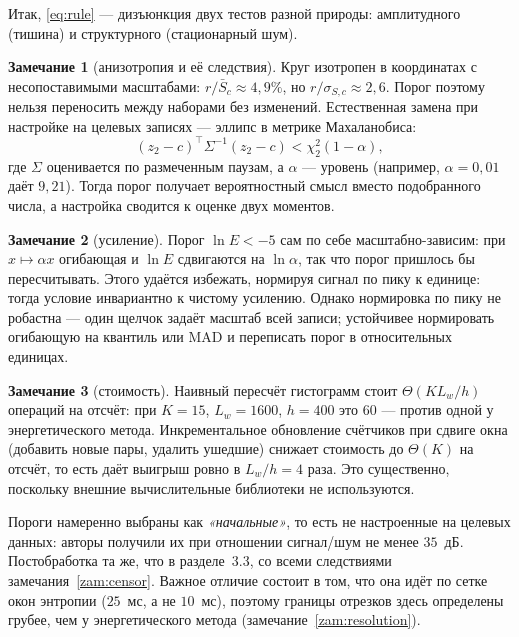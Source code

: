 \documentclass[11pt,a4paper]{article}
\theoremstyle{definition}
\newtheorem{zam}{Замечание}[section]
\theoremstyle{plain}
\begin{document}
Итак, \eqref{eq:rule} --- дизъюнкция двух тестов разной природы: амплитудного
(тишина) и структурного (стационарный шум).

\begin{zam}[анизотропия и её следствия]
Круг изотропен в координатах с несопоставимыми масштабами:
$r/\bar S_c\approx4{,}9\%$, но $r/\sigma_{S,c}\approx2{,}6$. Порог поэтому
нельзя переносить между наборами без изменений. Естественная замена при
настройке на целевых записях --- эллипс в метрике Махаланобиса:
\[
(z_2-c)^{\!\top}\Sigma^{-1}(z_2-c)<\chi^2_{2}(1-\alpha),
\]
где $\Sigma$ оценивается по размеченным паузам, а $\alpha$ --- уровень
(например, $\alpha=0{,}01$ даёт $9{,}21$). Тогда порог получает вероятностный
смысл вместо подобранного числа, а настройка сводится к оценке двух моментов.
\end{zam}

\begin{zam}[усиление]
Порог $\ln E<-5$ сам по себе масштабно-зависим: при $x\mapsto\alpha x$
огибающая и $\ln E$ сдвигаются на $\ln\alpha$, так что порог пришлось бы
пересчитывать. Этого удаётся избежать, нормируя сигнал по пику к единице:
тогда условие инвариантно к чистому усилению. Однако нормировка по пику
не робастна --- один щелчок задаёт масштаб всей записи; устойчивее нормировать
огибающую на квантиль или MAD и переписать порог в относительных единицах.
\end{zam}

\begin{zam}[стоимость]
Наивный пересчёт гистограмм стоит $\Theta(K L_w/h)$ операций на отсчёт: при
$K=15$, $L_w=1600$, $h=400$ это $60$ --- против одной у энергетического метода.
Инкрементальное обновление счётчиков при сдвиге окна (добавить новые пары,
удалить ушедшие) снижает стоимость до $\Theta(K)$ на отсчёт, то есть даёт
выигрыш ровно в $L_w/h=4$ раза. Это существенно, поскольку внешние
вычислительные библиотеки не используются.
\end{zam}

Пороги намеренно выбраны как \emph{«начальные»}, то есть не настроенные на
целевых данных: авторы получили их при отношении сигнал/шум не менее $35$~дБ.
Постобработка та же, что в разделе~3.3, со всеми следствиями
замечания~\ref{zam:censor}. Важное отличие состоит в том, что она идёт по сетке
окон энтропии ($25$~мс, а не $10$~мс), поэтому границы отрезков здесь определены
грубее, чем у энергетического метода (замечание~\ref{zam:resolution}).

\end{document}
